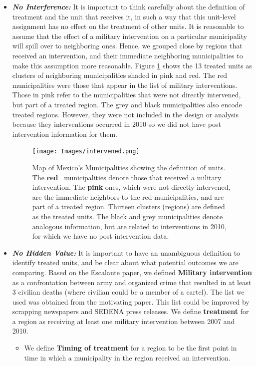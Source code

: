 \documentclass{article}[11 pt]
\begin{document}
		\begin{itemize}
			\item \emph{\textbf{No Interference:}} It is important to think carefully about the definition of treatment and the unit that receives it, in such a way that this unit-level assignment has no effect on the treatment of other units. It is reasonable to assume that the effect of a military intervention on a particular municipality will spill over to neighboring ones. Hence, we grouped close by regions that received an intervention, and their immediate neighboring municipalities to make this assumption more reasonable. Figure \ref{treatedUnits} shows the 13 treated units as clusters of neighboring municipalities shaded in pink and red. The red municipalities were those that appear in the list of military interventions. Those in pink refer to the municipalities that were not directly intervened, but part of a treated region. The grey and black municipalities also encode treated regions. However, they were not included in the design or analysis because they interventions occurred in 2010 so we did not have post intervention information for them. 
			\begin{figure}[htdp]
				\centering
			      \texttt{[image: Images/intervened.png]}

			      \caption{Map of Mexico's Municipalities showing the definition of units. The \textbf{red} \ municipalities denote those that received a military intervention. The \textbf{pink} ones, which were not directly intervened, are the immediate neighbors to the red municipalities, and are part of a treated region. Thirteen clusters (regions) are defined as the treated units. The black and grey municipalities denote analogous information, but are related to interventions in 2010, for which we have no post intervention data.}
						\label{treatedUnits}
			\end{figure}
			
			\item \emph{\textbf{No Hidden Value:}} It is important to have an unambiguous definition to identify treated units, and be clear about what potential outcomes we are comparing. Based on the Escalante paper, we defined \textbf{ Military intervention} as a confrontation between army and organized crime that resulted in at least 3 civilian deaths (where civilian could be a member of a cartel). The list we used was obtained from the motivating paper. This list could be improved by scrapping newspapers and SEDENA press releases. We define \textbf{treatment} for a region as receiving at least one military intervention between 2007 and 2010.
			\begin{itemize}
				\item We define \textbf{Timing of treatment} for a region to be the first point in time in which a municipality in the region received an intervention.
			\end{itemize}  			
		\end{itemize}
		
\end{document}
